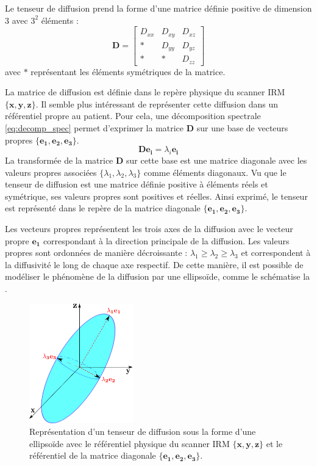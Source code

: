 Le tenseur de diffusion prend la forme d'une matrice définie positive de dimension 3 avec $3^2$ éléments :
\begin{equation}
    \mathbf{D} = \left[\begin{array}{ccc}
	D_{xx} & D_{xy} & D_{xz}\\
	* & D_{yy} & D_{yz}\\
	* & * & D_{zz}
	\end{array}\right] 
    \label{eq:tenseur_mat}
\end{equation}
\noindent avec $*$ représentant les éléments symétriques de la matrice.

La matrice de diffusion est définie dans le repère physique du scanner IRM $\{\mathbf{x,y,z}\}$.
Il semble plus intéressant de représenter cette diffusion dans un référentiel propre au patient.
Pour cela, une décomposition spectrale \eqref{eq:decomp_spec} permet d'exprimer la matrice $\mathbf{D}$
sur une base de vecteurs propres $\{\mathbf{e_1,e_2,e_3}\}$.
\begin{equation}
    \mathbf{D}\mathbf{e_i} = \lambda_i \mathbf{e_i}
    \label{eq:decomp_spec}
\end{equation}
La transformée de la matrice $\mathbf{D}$ sur cette base est une matrice diagonale 
avec les valeurs propres associées $\{\lambda_1,\lambda_2,\lambda_3\}$ comme éléments diagonaux.
Vu que le tenseur de diffusion est une matrice définie positive à éléments réels et symétrique, 
ses valeurs propres sont positives et réelles.
Ainsi exprimé, le tenseur est représenté dans le repère de la matrice diagonale $\{\mathbf{e_1,e_2,e_3}\}$.

Les vecteurs propres représentent les trois axes de la diffusion avec le vecteur propre $\mathbf{e_1}$
correspondant à la direction principale de la diffusion.
Les valeurs propres sont ordonnées de manière décroissante : $\lambda_1 \geq \lambda_2 \geq \lambda_3$ 
et correspondent à la diffusivité le long de chaque axe respectif.
De cette manière, il est possible de modéliser le phénomène de la diffusion par une ellipsoïde,
comme le schématise la .

\begin{figure}[ht]
    \centering
    \includegraphics[width=0.4\textwidth]{Images/tensor.pdf}
    \caption{\label{fig:tenseur}Représentation d'un tenseur de diffusion sous la forme d'une ellipsoïde 
    avec le référentiel physique du scanner IRM $\{\mathbf{x,y,z}\}$
    et le référentiel de la matrice diagonale $\{\mathbf{e_1,e_2,e_3}\}$.}
\end{figure}

